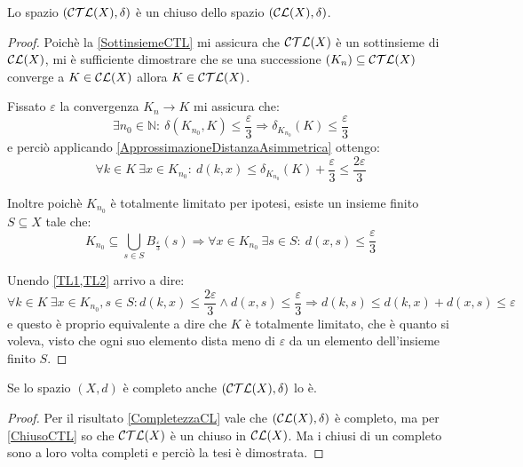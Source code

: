 \begin{lemma}\label{ChiusoCTL}
	Lo spazio $(\mathcal{CTL}(X),\delta)$ è un chiuso dello spazio $(\mathcal{CL}(X),\delta)$.
\end{lemma}
\begin{proof}
	Poichè la \cref{SottinsiemeCTL} mi assicura che $\mathcal{CTL}(X)$ è un sottinsieme di $\mathcal{CL}(X)$, mi è sufficiente dimostrare che se una successione $(K_n) \subseteq \mathcal{CTL}(X)$ converge a $K\in\mathcal{CL}(X)$ allora $K\in\mathcal{CTL}(X)$.
	
	Fissato $\varepsilon$ la convergenza $K_n\to K$ mi assicura che:
	\begin{equation*}
		\exists n_0\in\mathbb{N}:\ \delta(K_{n_0},K)\le \frac{\varepsilon}3
		\Longrightarrow \delta_{K_{n_0}}(K)\le \frac{\varepsilon}3
	\end{equation*}
	e perciò applicando \cref{ApprossimazioneDistanzaAsimmetrica} ottengo:
	\begin{equation}\label{TL1}
		\forall k\in K\ \exists x\in K_{n_0}:
		\ d(k,x)\le \delta_{K_{n_0}}(K)+\frac{\varepsilon}3\le \frac{2\varepsilon}3
	\end{equation}
	
	Inoltre poichè $K_{n_0}$ è totalmente limitato per ipotesi, esiste un insieme finito $S \subseteq X$ tale che:
	\begin{equation}\label{TL2}
		K_{n_0}\subseteq \bigcup_{s\in S} B_{\frac{\varepsilon}3}(s)
		\Longrightarrow \forall x\in K_{n_0}\ \exists s\in S:\ d(x,s)\le \frac{\varepsilon}3
	\end{equation}
	
	Unendo \cref{TL1,TL2} arrivo a dire:
	\begin{equation}
		\forall k\in K\ \exists x\in K_{n_0},s\in S: d(k,x)\le \frac{2\varepsilon}3 \wedge d(x,s)\le \frac{\varepsilon}3
		\Longrightarrow d(k,s)\le d(k,x)+d(x,s) \le \varepsilon
	\end{equation}
	e questo è proprio equivalente a dire che $K$ è totalmente limitato, che è quanto si voleva, visto che ogni suo elemento dista meno di $\varepsilon$ da un elemento dell'insieme finito $S$.
\end{proof}

\begin{corollary}\label{CompletezzaCTL}
	Se lo spazio $(X,d)$ è completo anche $(\mathcal{CTL}(X),\delta)$ lo è.
\end{corollary}
\begin{proof}
	Per il risultato \cref{CompletezzaCL} vale che $(\mathcal{CL}(X),\delta)$ è completo, ma per \cref{ChiusoCTL} so che $\mathcal{CTL}(X)$ è un chiuso in $\mathcal{CL}(X)$. Ma i chiusi di un completo sono a loro volta completi e perciò la tesi è dimostrata.
\end{proof}

